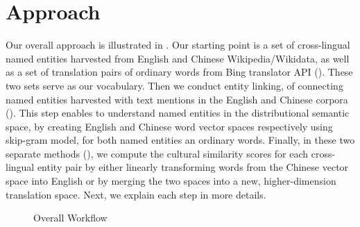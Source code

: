\section{Approach}
Our overall approach is illustrated in .
Our starting point is a set of cross-lingual
named entities harvested from English and Chinese Wikipedia/Wikidata,
as well as a set of translation pairs of ordinary words from Bing translator API
().
These two sets serve as our vocabulary.
Then we conduct entity linking, of connecting named entities harvested with
text mentions
 in the English
and Chinese corpora
().
This step enables to understand named entities in the distributional semantic space, by creating English and Chinese word vector spaces respectively using skip-gram model, for both named entities an ordinary words.
Finally, in these two separate methods (),
we compute the cultural similarity scores
for each cross-lingual entity pair by either linearly transforming words
from the Chinese vector space into English or by merging the two spaces into
a new, higher-dimension translation space. Next, we explain each step in
more details.
%
%
\begin{figure}[th]
\centering
{}
\caption{Overall Workflow}
\label{fig:approach}
\end{figure}



